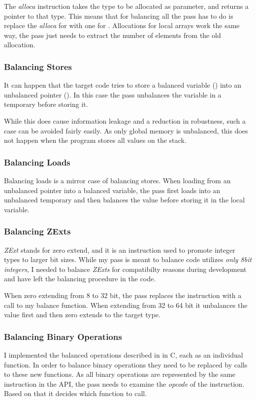 The \emph{alloca} instruction takes the type to be allocated as parameter, and returns a pointer to that type.
This means that for balancing all the pass has to do is replace the \emph{alloca} for  with one for .
Allocations for local arrays work the same way, the pass just needs to extract the number of elements from the old allocation.

\subsubsection{Balancing Stores}
It can happen that the target code tries to store a balanced variable () into an unbalanced pointer ().
In this case the pass unbalances the variable in a temporary before storing it.

While this does cause information leakage and a reduction in robustness, such a case can be avoided fairly easily.
As only global memory is unbalanced, this does not happen when the program stores all values on the stack.

\subsubsection{Balancing Loads}
Balancing loads is a mirror case of balancing stores.
When loading from an unbalanced pointer into a balanced variable, the pass first loads into an unbalanced temporary and then balances the value before storing it in the local variable.

\subsubsection{Balancing ZExts}
\emph{ZExt} stands for zero extend, and it is an instruction used to promote integer types to larger bit sizes.
While my pass is meant to balance code utilizes \emph{only 8bit integers}, I needed to balance \emph{ZExts} for compatibilty reasons during development and have left the balancing procedure in the code.

When zero extending from 8 to 32 bit, the pass replaces the instruction with a call to my balance function.
When extending from 32 to 64 bit it unbalances the value first and then zero extends to the target type.

\subsubsection{Balancing Binary Operations}
I implemented the balanced operations described in  in C, each as an individual function.
In order to balance binary operations they need to be replaced by calls to these new functions.
As all binary operations are represented by the same instruction in the \llvm{} API, the pass needs to examine the \emph{opcode} of the instruction.
Based on that it decides which function to call.

